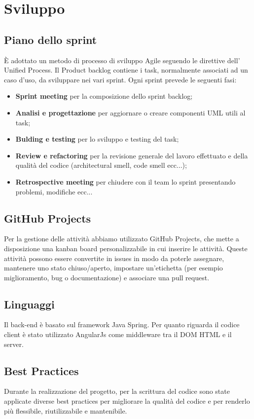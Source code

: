 \documentclass[12pt]{article}
\begin{document}
\section{Sviluppo}
\subsection{Piano dello sprint}
\`{E} adottato un metodo di processo di sviluppo Agile seguendo le direttive dell' Unified Process. Il Product backlog contiene i task, normalmente associati ad un caso d'uso,  da sviluppare nei vari sprint. Ogni sprint prevede le seguenti fasi:
\begin{itemize}
\item {\textbf {Sprint meeting}} per la composizione dello sprint backlog;
\item {\textbf {Analisi e progettazione}}  per aggiornare o creare componenti UML utili al task;
\item {\textbf {Bulding e testing}}  per lo sviluppo e testing del task;
\item {\textbf {Review e refactoring}} per la revisione generale del lavoro effettuato e della qualità del codice (architectural smell, code smell ecc...);
\item {\textbf {Retrospective meeting}} per chiudere con il team lo sprint presentando problemi, modifiche ecc...

\end{itemize}

\subsection{GitHub Projects}
Per la gestione delle attività abbiamo utilizzato GitHub Projects, che mette a disposizione una kanban board personalizzabile in cui inserire le attività. Queste attività possono essere convertite in issues in modo da poterle assegnare, mantenere uno stato chiuso/aperto, impostare un’etichetta (per esempio miglioramento, bug o documentazione) e associare una pull request.

\subsection{Linguaggi}
Il back-end è basato sul framework Java Spring. Per quanto riguarda il codice client è stato utilizzato AngularJs come middleware tra il DOM HTML e il server.

\subsection{Best Practices}
Durante la realizzazione del progetto, per la scrittura del codice sono state applicate diverse best practices per migliorare la qualità del codice e per renderlo più flessibile, riutilizzabile e mantenibile.
\end{document}
